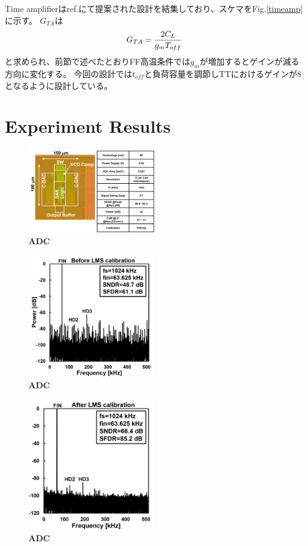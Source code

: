 \documentclass[letterpaper, 10 pt, conference]{ieeeconf}  %
\begin{document}
Time amplifierはref.\cite{lee20089}にて提案された設計を結集しており、スケマをFig.\ref{timeamp}に示す。
$G_{TA}$は
\begin{eqnarray}
    \centering
    G_{TA} = \frac{2C_L}{g_mT_{off}}
    \label{gta}
\end{eqnarray}
と求められ\cite{lee20089}、前節で述べたとおりFF高温条件では$g_m$が増加するとゲインが減る方向に変化する。
今回の設計では$t_{off}$と負荷容量を調節しTTにおけるゲインが8となるように設計している。

\section{Experiment Results}
\begin{figure}[ht!]
\centering
 \includegraphics[width=0.5\textwidth]{figs/chipphoto.png}
  \captionsetup{font=footnotesize}
  \caption{\textbf{ADC}}
  \label{highlight}
\end{figure}

\begin{figure}[ht!]
\centering
 \includegraphics[width=0.5\textwidth]{figs/beforecal.png}
  \captionsetup{font=footnotesize}
  \caption{\textbf{ADC}}
  \label{highlight}
\end{figure}

\begin{figure}[ht!]
\centering
 \includegraphics[width=0.5\textwidth]{figs/aftercal.png}
  \captionsetup{font=footnotesize}
  \caption{\textbf{ADC}}
  \label{highlight}
\end{figure}
\end{document}
